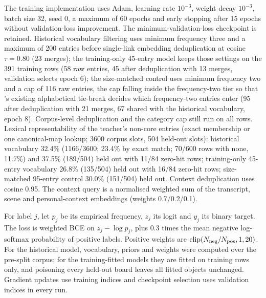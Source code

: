 The training implementation uses Adam, learning rate $10^{-3}$, weight decay $10^{-3}$, batch size 32, seed 0, a maximum of 60 epochs and early stopping after 15 epochs without validation-loss improvement. The minimum-validation-loss checkpoint is retained. Historical vocabulary filtering uses minimum frequency three and a maximum of 200 entries before single-link embedding deduplication at cosine $\tau=0.80$ (23 merges); the training-only 45-entry model keeps those settings on the 391 training rows (58 raw entries, 45 after deduplication with 13 merges, validation selects epoch 6); the size-matched control uses minimum frequency two and a cap of 116 raw entries, the cap falling inside the frequency-two tier so that 's existing alphabetical tie-break decides which frequency-two entries enter (95 after deduplication with 21 merges, 67 shared with the historical vocabulary, epoch 8). Corpus-level deduplication and the category cap still run on all rows. %
Lexical representability of the teacher's non-core entries (exact membership or one canonical-map lookup; 3600 corpus slots, 504 held-out slots): historical vocabulary 32.4\% (1166/3600; 23.4\% by exact match; 70/600 rows with none, 11.7\%) and 37.5\% (189/504) held out with 11/84 zero-hit rows; training-only 45-entry vocabulary 26.8\% (135/504) held out with 16/84 zero-hit rows; size-matched 95-entry control 30.0\% (151/504) held out. %
Context deduplication uses cosine 0.95. The context query is a normalised weighted sum of the transcript, scene and personal-context embeddings (weights 0.7/0.2/0.1).

For label $j$, let $p_j$ be its empirical frequency, $z_j$ its logit and $y_j$ its binary target. The loss is weighted BCE on $z_j-\log p_j$, plus $0.3$ times the mean negative log-softmax probability of positive labels. Positive weights are $\mathrm{clip}(N_{\rm neg}/N_{\rm pos},1,20)$. For the historical model, vocabulary, priors and weights were computed over the pre-split corpus; for the training-fitted models they are fitted on training rows only, and poisoning every held-out board leaves all fitted objects unchanged. %
Gradient updates use training indices and checkpoint selection uses validation indices in every run.

